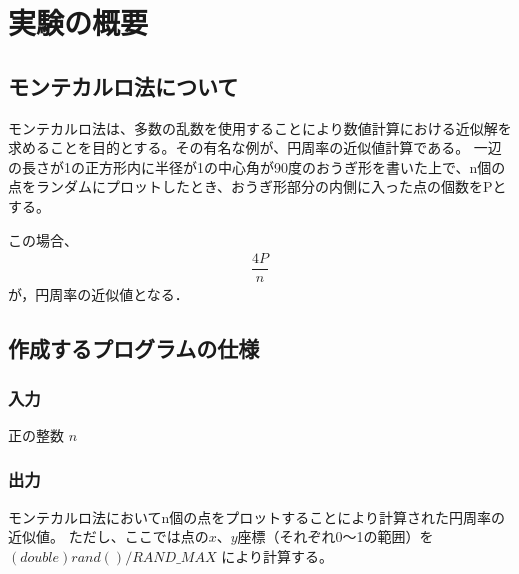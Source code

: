 

\section{実験の概要}
\subsection{モンテカルロ法について}
  モンテカルロ法は、多数の乱数を使用することにより数値計算における近似解を求めることを目的とする。その有名な例が、円周率の近似値計算である。
  一辺の長さが1の正方形内に半径が1の中心角が90度のおうぎ形を書いた上で、n個の点をランダムにプロットしたとき、おうぎ形部分の内側に入った点の個数をPとする。

  この場合、
  \begin{align*}
    \dfrac{4P}{n}
  \end{align*}
  が，円周率の近似値となる．

\subsection{作成するプログラムの仕様}
  \subsubsection{入力}
    正の整数 $n$
  
  \subsubsection{出力}
    モンテカルロ法においてn個の点をプロットすることにより計算された円周率の近似値。
    ただし、ここでは点の$x$、$y$座標（それぞれ0～1の範囲）を $(double)rand() / RAND\_MAX$ により計算する。



